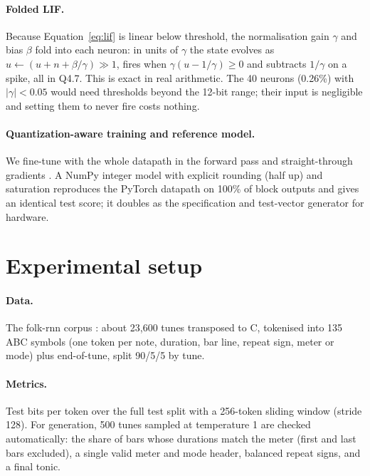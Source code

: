 \documentclass[10pt]{article}
\begin{document}
\paragraph{Folded LIF.} Because Equation~\ref{eq:lif} is linear below threshold, the normalisation gain $\gamma$
and bias $\beta$ fold into each neuron: in units of $\gamma$ the state evolves as
$u \leftarrow (u + n + \beta/\gamma) \gg 1$, fires when $\gamma(u - 1/\gamma) \ge 0$ and subtracts $1/\gamma$ on a
spike, all in Q4.7. This is exact in real arithmetic. The 40 neurons (0.26\%) with $|\gamma| < 0.05$ would need
thresholds beyond the 12-bit range; their input is negligible and setting them to never fire costs nothing.

\paragraph{Quantization-aware training and reference model.} We fine-tune with the whole datapath in the forward
pass and straight-through gradients \citep{bengio2013estimating}. A NumPy integer model with explicit rounding
(half up) and saturation reproduces the PyTorch datapath on 100\% of block outputs and gives an identical test
score; it doubles as the specification and test-vector generator for hardware.

\section{Experimental setup}
\label{sec:setup}

\paragraph{Data.} The folk-rnn corpus \citep{sturm2016folkrnn}: about 23{,}600 tunes transposed to C, tokenised
into 135 ABC symbols (one token per note, duration, bar line, repeat sign, meter or mode) plus end-of-tune, split
90/5/5 by tune.

\paragraph{Metrics.} Test bits per token over the full test split with a 256-token sliding window (stride 128).
For generation, 500 tunes sampled at temperature 1 are checked automatically: the share of bars whose durations
match the meter (first and last bars excluded), a single valid meter and mode header, balanced repeat signs, and a
final tonic.
\end{document}

